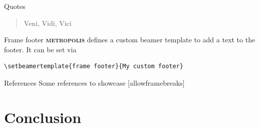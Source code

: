\documentclass[10pt]{beamer}
\newcommand{\themename}{\textbf{\textsc{metropolis}}\xspace}
\begin{document}




\begin{frame}{Quotes}
  \begin{quote}
    Veni, Vidi, Vici
  \end{quote}
\end{frame}

{%
\begin{frame}[fragile]{Frame footer}
    \themename defines a custom beamer template to add a text to the footer. It can be set via
    \begin{verbatim}\setbeamertemplate{frame footer}{My custom footer}\end{verbatim}
\end{frame}
}

\begin{frame}{References}
  Some references to showcase [allowframebreaks] 
\end{frame}

\section{Conclusion}
\end{document}
